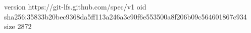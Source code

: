 version https://git-lfs.github.com/spec/v1
oid sha256:35833b20bec9368da5ff113a246a3c90f6e553500a8f206b09c564601867c934
size 2872

